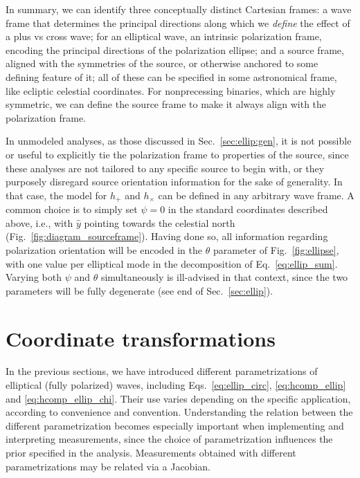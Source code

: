 \documentclass[aps,prd,twocolumn,superscriptaddress,preprintnumbers,floatfix,nofootinbib]{revtex4-2}
\newcommand*{\eq}[1]{Eq.~\eqref{eq:#1}}
\begin{document}
In summary, we can identify three conceptually distinct Cartesian frames: a wave frame that determines the principal directions along which we \emph{define} the effect of a plus vs cross wave; for an elliptical wave, an intrinsic polarization frame, encoding the principal directions of the polarization ellipse; and a source frame, aligned with the symmetries of the source, or otherwise anchored to some defining feature of it; all of these can be specified in some astronomical frame, like ecliptic celestial coordinates.
For nonprecessing binaries, which are highly symmetric, we can define the source frame to make it always align with the polarization frame.

In unmodeled analyses, as those discussed in Sec.~\ref{sec:ellip:gen}, it is not possible or useful to explicitly tie the polarization frame to properties of the source, since these analyses are not tailored to any specific source to begin with, or they purposely disregard source orientation information for the sake of generality.
In that case, the model for $h_+$ and $h_\times$ can be defined in any arbitrary wave frame.
A common choice is to simply set $\psi = 0$ in the standard coordinates described above, i.e., with $\hat{y}$ pointing towards the celestial north (Fig.~\ref{fig:diagram_sourceframe}).
Having done so, all information regarding polarization orientation will be encoded in the $\theta$ parameter of Fig.~\ref{fig:ellipse}, with one value per elliptical mode in the decomposition of \eq{ellip_sum}.
Varying both $\psi$ and $\theta$ simultaneously is ill-advised in that context, since the two parameters will be fully degenerate (see end of Sec.~\ref{sec:ellip}).

\section{Coordinate transformations}

In the previous sections, we have introduced different parametrizations of elliptical (fully polarized) waves, including Eqs.~\eqref{eq:ellip_circ}, \eqref{eq:hcomp_ellip} and \eqref{eq:hcomp_ellip_chi}.
Their use varies depending on the specific application, according to convenience and convention.
Understanding the relation between the different parametrization becomes especially important when implementing and interpreting measurements, since the choice of parametrization influences the prior specified in the analysis.
Measurements obtained with different parametrizations may be related via a Jacobian.
\end{document}
